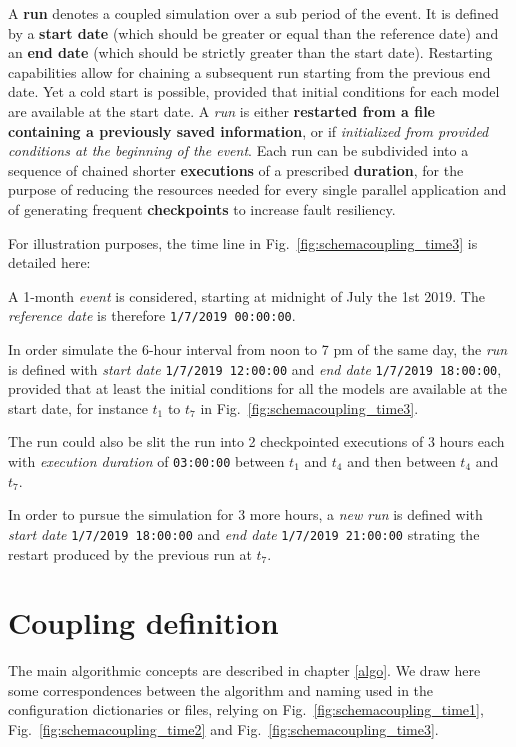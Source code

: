 \documentclass[Coupling]{../../data/TelemacDoc} %
\begin{document}
A {\bf run} denotes a coupled simulation over a sub period 
of the event. It is defined by a {\bf start date} (which
should be greater or equal than the reference date) and an
{\bf end date} (which should be strictly greater than the
start date). Restarting capabilities allow for chaining a subsequent
run starting from the previous end date. Yet a cold start is possible, provided that initial conditions for each
model are available at the start date. A {\em run} is either 
{\bf restarted from a file containing a
previously saved information}, or if {\em initialized from provided conditions at the beginning of the event}.  
Each run can be subdivided into a sequence of chained shorter
{\bf executions} of a prescribed {\bf duration}, for the
purpose of reducing the resources needed for every single parallel
application and of generating frequent {\bf checkpoints}  to
increase fault resiliency. 
\newline

For illustration purposes, the time line in Fig.~\ref{fig:schemacoupling_time3} is detailed here:

A 1-month {\em event} is considered, starting at midnight of July the 1st
2019. The {\em reference date} is therefore \texttt{1/7/2019
  00:00:00}.

In order simulate the 6-hour interval from noon to 7 pm of the same day,
the {\em run} is defined with {\em start date} \texttt{1/7/2019
  12:00:00} and {\em end date} \texttt{1/7/2019 18:00:00}, provided
that at least the initial conditions for all the models are available
at the start date, for instance  $t_1$ to $t_7$ in Fig.~\ref{fig:schemacoupling_time3}.

The run could also be slit the run into 2 checkpointed executions of 3
hours each with {\em  execution duration} of
\texttt{03:00:00} between $t_1$ and $t_4$ and then between $t_4$ and $t_7$.

In order to pursue the simulation for 3 more hours, a {\em
  new run} is defined with {\em start date} \texttt{1/7/2019
  18:00:00} and {\em end date} \texttt{1/7/2019 21:00:00} strating 
the restart produced by the previous run at $t_7$.

\section{Coupling definition}\label{namcon:COUPLING}
The main algorithmic concepts are described in chapter \ref{algo}. We
draw here some correspondences between the algorithm and naming
 used in the configuration dictionaries or files, relying
on Fig.~\ref{fig:schemacoupling_time1},
Fig.~\ref{fig:schemacoupling_time2} and
Fig.~\ref{fig:schemacoupling_time3}. 
\end{document}
